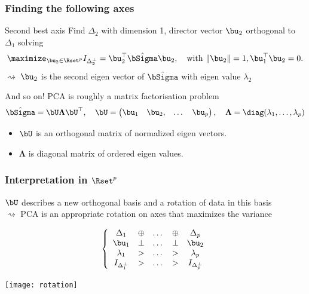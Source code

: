 \documentclass{beamer}\usepackage[]{graphicx}\usepackage[]{color}
\begin{document}
\begin{frame}
  \frametitle{Finding the following axes}

  \begin{block}{Second best axis}
    Find $\Delta_2$ with dimension 1, director vector $\bu_2$ orthogonal to $\Delta_1$ solving
    \begin{equation*}
        \maximize_{\bu_2 \in \Rset^p} I_{\Delta_2^\bot} = \bu_2^\top \hat{\bSigma}\bu_2, \quad \text{with } \|\bu_2\| = 1, \bu_1^\top \bu_2 = 0.
    \end{equation*} 
  $\rightsquigarrow$ $\bu_2$ is the second eigen vector of $\hat\bSigma$ with eigen value $\lambda_2$
  \end{block}
  
  \vfill
  \pause
  
  \begin{block}{And so on!}
    PCA is roughly a matrix factorisation problem 
    \begin{equation*}
      \hat\bSigma = \bU \boldsymbol\Lambda \bU^\top, \quad
      \bU = \begin{pmatrix}
      \bu_1 & \bu_2, & \dots & \bu_p
      \end{pmatrix}, \quad \boldsymbol\Lambda = \diag(\lambda_1, \dots, \lambda_p)
    \end{equation*}
    \hspace{-.5cm}
  \begin{itemize}
    \item $\bU$ is an orthogonal matrix of normalized eigen vectors.
    \item $\boldsymbol\Lambda$ is diagonal matrix of  ordered eigen values.
  \end{itemize}
  \end{block}
\end{frame}

\begin{frame}
  \frametitle{Interpretation in $\Rset^p$}
    
  $\bU$ describes a new orthogonal basis and a rotation of data in this basis\\
  $\rightsquigarrow$ PCA is an appropriate rotation on axes that maximizes the variance

  \begin{equation*}
    \left\{\begin{array}{ccccc}
      \Delta_1 & \oplus & \dots & \oplus & \Delta_p \\
      \bu_1 & \bot & \dots & \bot & \bu_2 \\
      \lambda_1 & > & \dots & > & \lambda_p \\
      I_{\Delta_1^\bot} & > & \dots & > & I_{\Delta_p^\bot} \\
    \end{array}\right.
  \end{equation*}

  \texttt{[image: rotation]}
\end{frame}
\end{document}

